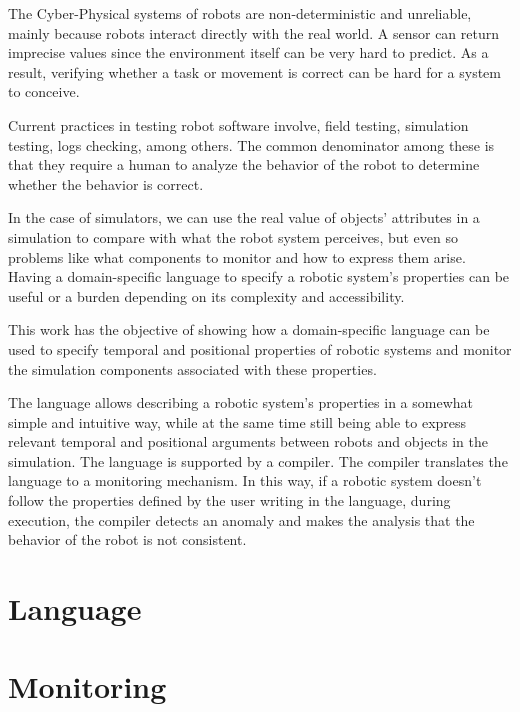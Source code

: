 \documentclass[runningheads]{llncs}
\begin{document}
The Cyber-Physical systems of robots are non-deterministic and unreliable, mainly because robots interact directly with the real world. A sensor can return imprecise values since the environment itself can be very hard to predict. As a result, verifying whether a task or movement is correct can be hard for a system to conceive.

Current practices in testing robot software involve, field testing, simulation testing, logs checking, among others. The common denominator among these is that they require a human to analyze the behavior of the robot to determine whether the behavior is correct.

In the case of simulators, we can use the real value of objects' attributes in a simulation to compare with what the robot system perceives, but even so problems like what components to monitor and how to express them arise. Having a domain-specific language to specify a robotic system's properties can be useful or a burden depending on its complexity and accessibility.

This work has the objective of showing how a domain-specific language can be used to specify temporal and positional properties of robotic systems and monitor the simulation components associated with these properties.

The language allows describing a robotic system's properties in a somewhat simple and intuitive way, while at the same time still being able to express relevant temporal and positional arguments between robots and objects in the simulation. The language is supported by a compiler. The compiler translates the language to a monitoring mechanism. In this way, if a robotic system doesn't follow the properties defined by the user writing in the language, during execution, the compiler detects an anomaly and makes the analysis that the behavior of the robot is not consistent.

\section{Language}

\section{Monitoring}
\end{document}
